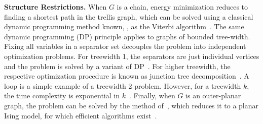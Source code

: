 \textbf{Structure Restrictions.} When $G$ is a chain, energy minimization
reduces to finding a shortest path in the trellis graph, which can be solved using a classical dynamic programming method known, \eg, as the Viterbi algorithm~\cite{forney1973viterbi}.
The same dynamic programming (DP) principle applies to graphs of bounded tree-width.  Fixing all variables in a separator set decouples the problem into independent optimization problems. For treewidth 1, the separators are just individual vertices and the problem is solved by a variant of DP~\cite{Pearl-88,SchlesingerHlavac2002}.
For higher treewidth, the respective optimization procedure is known as junction tree decomposition~\cite{Lauritzen96}. A loop is a simple example of a treewidth 2 problem. However, for a treewidth $k$, the time complexity is exponential in $k$~\cite{Lauritzen96}.
Finally, when $G$ is an outer-planar graph, the problem can be solved by the method of~\cite{Schraudolph-10}, which reduces it to a planar Ising model, for which efficient algorithms exist~\cite{Shih-90}.


